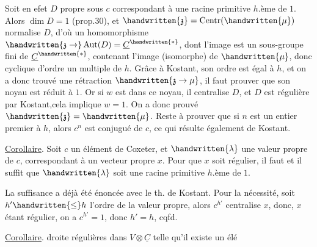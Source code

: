Soit en efet $D$  propre sous $c$ correspondant à une racine primitive $h$.ème de $1$. Alors $\dim D=1$ (prop.30), et $\handwritten{\mathfrak{z}}=\operatorname{Centr}(\handwritten{\mu})$ normalise $D$, d'où un homomorphisme $\handwritten{\mathfrak{z}\to}\operatorname{Aut}(D)=\underline{C}^{\handwritten{*}}$, dont l'image est un sous-groupe fini de $\underline{C}^{\handwritten{*}}$, contenant l'image (isomorphe) de $\handwritten{\mu}$, donc cyclique d'ordre un multiple de $h$. Grâce à Kostant, son ordre est égal à $h$, et on a donc trouvé une rétraction $\handwritten{\mathfrak{z}\to\mu}$, il faut prouver que son noyau est réduit à $1$. Or si $w$ est dans ce noyau, il  centralise $D$, et  $D$ est régulière par Kostant,cela implique $w=1$. On a donc prouvé $\handwritten{\mathfrak{z}}=\handwritten{\mu}$. Reste à prouver que si $n$ est un entier premier à $h$, alors $c^n$ est conjugué de $c$, ce qui résulte également de Kostant.

\uline{Corollaire}. Soit $c$ un élément de Coxeter, et $\handwritten{\lambda}$ une valeur propre de $c$, correspondant à un vecteur propre $x$. Pour que $x$ soit régulier, il faut et il suffit que $\handwritten{\lambda}$ soit une racine primitive $h$.ème de $1$.

La suffisance a déjà été énoncée avec le th. de Kostant. Pour la nécessité, soit $h'\handwritten{\leq}h$ l'ordre de la valeur propre, alors $c^{h'}$ centralise $x$, donc, $x$ étant régulier, on a $c^{h'}=1$, donc $h'=h$, cqfd.

\uline{Corollaire}.   droite régulières dans $V\otimes\underline{C}$ telle qu'il existe un élé%
